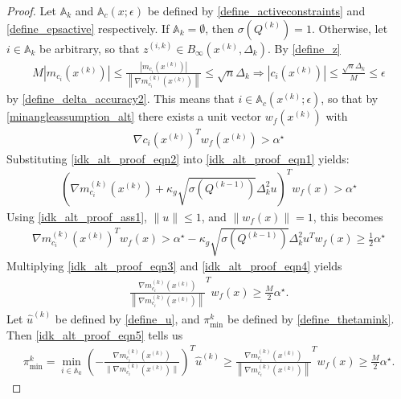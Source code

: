 \documentclass{article}
\theoremstyle{case}
\numberwithin{theorem}{subsection}
\DeclareMathOperator*{\argmin}{arg\,min}
\newcommand{\activeconstraintsk}{{\mathbb A_{k}}}
\newcommand{\dacc}{{\Delta_{\textrm{acc}}}}
\newcommand{\dk}{\Delta_k}
\newcommand{\gmcik}{{\nabla m_{c_i}^{(k)}\left(\xk\right)}}
\newcommand{\hgik}{{\frac{\nabla m^{(k)}_{c_i}(\xk)}{\|\nabla m^{(k)}_{c_i}\left(\xk\right)\|}}}
\newcommand{\huk}{{{\hat u}^{(k)}}}
\newcommand{\minanglealpha}{{ \alpha^{\star} }}
\newcommand{\qk}{{Q^{(k)}}}
\newcommand{\thetamink}{{\pi^k_{\textrm{min}}}}
\newcommand{\tr}{{ B_{\infty}\left(\xk, \dk\right) }}
\newcommand{\xk}{x^{(k)}}
\newcommand{\zik}{{z^{(i, k)}}}
\newcommand{\minanglediralt}{{w_f}}
\newcommand{\epsactive}{{\mathbb A_c}}
\newcommand{\epsactivemodels}{{\mathbb A_{m}}}
\begin{document}
\begin{proof}
Let $\activeconstraintsk$ and $\epsactive(x; \epsilon)$
be defined by
\cref{define_activeconstraints} and \cref{define_epsactive}
respectively.
If $\activeconstraintsk = \emptyset$, then $\sigma\left(\qk\right) = 1$.
Otherwise, let $i \in \activeconstraintsk$ be arbitrary,
so that $\zik \in \tr$. By \cref{define_z}
\begin{align*}
M \left|m_{c_i}\left(\xk\right)\right| \le \frac{\left|m_{c_i}\left(\xk\right)\right|}{\left\|\gmcik\right\|} \le \sqrt{n} \dk \Longrightarrow
\left|c_i\left(\xk\right)\right| \le \frac{\sqrt{n}\dk}{M} \le \epsilon
\end{align*}
by \cref{define_delta_accuracy2}.
This means that $i \in \epsactive(\xk; \epsilon)$, so that by \cref{minangleassumption_alt} there exists a unit vector $\minanglediralt(\xk)$ with
\begin{align}
\nabla c_i\left(\xk\right)^T\minanglediralt\left(\xk\right) > \minanglealpha \label{idk_alt_proof_eqn1}
\end{align}
Substituting \cref{idk_alt_proof_eqn2} into \cref{idk_alt_proof_eqn1} yields:
\begin{align*}
\left(\gmcik + \kappa_g \sqrt{\sigma\left( Q^{(k-1)} \right)}\dk^2 u\right)^T \minanglediralt(x) > \minanglealpha
\end{align*}
Using \cref{idk_alt_proof_ass1}, $\|u\|\le 1$, and $\|\minanglediralt(x)\| = 1$, this becomes
\begin{align}
\gmcik^T\minanglediralt(x) > \minanglealpha - \kappa_g \sqrt{\sigma\left( Q^{(k-1)} \right)}\dk^2 u^T\minanglediralt(x) \ge \frac 1 2 \minanglealpha \label{idk_alt_proof_eqn3}
\end{align}
Multiplying \cref{idk_alt_proof_eqn3} and \cref{idk_alt_proof_eqn4} yields
\begin{align}
\frac{\gmcik}{\left\|\gmcik\right\|}^T  \minanglediralt(x) \ge \frac M 2 \minanglealpha. \label{idk_alt_proof_eqn5}
\end{align}
Let $\huk$ be defined by \cref{define_u}, 
and $\thetamink$ be defined by \cref{define_thetamink}.
Then \cref{idk_alt_proof_eqn5} tells us 
\begin{align*}
\thetamink = \min_{i \in \activeconstraintsk} \left(-\hgik\right)^T \huk \ge \frac{\gmcik}{\left\|\gmcik\right\|}^T \minanglediralt(x) \ge \frac M 2 \minanglealpha.
\end{align*}


\end{proof}
\end{document}
